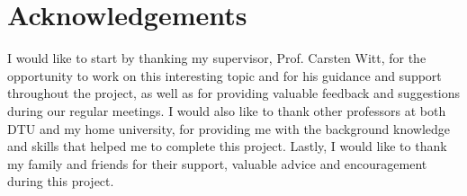 \section*{Acknowledgements}

I would like to start by thanking my supervisor, Prof. Carsten Witt, for the opportunity to work on this interesting topic and for his guidance and support throughout the project, as well as for
providing valuable feedback and suggestions during our regular meetings. I would also like to thank other professors at both DTU and my home university, for providing me with
the background knowledge and skills that helped me to complete this project. Lastly, I would like to thank my family and friends for their support, valuable advice and encouragement during this project.

